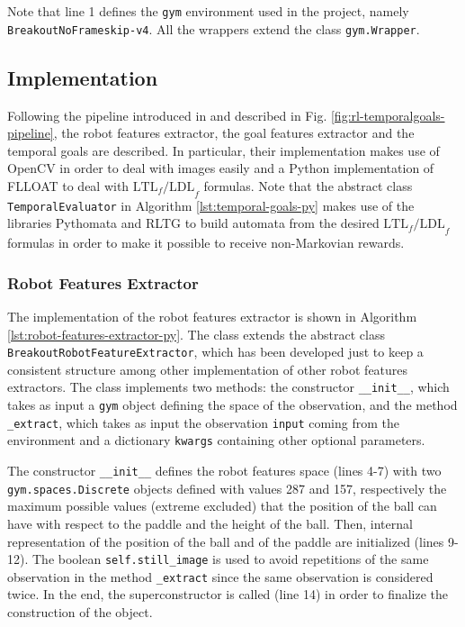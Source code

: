 Note that line 1 defines the \texttt{gym} environment used in the project,
namely \texttt{BreakoutNoFrameskip-v4}. All the wrappers extend the class
\texttt{gym.Wrapper}.



\subsection{Implementation}
Following the pipeline introduced in \cite{DBLP:journals/corr/abs-1807-06333}
and described in Fig. \ref{fig:rl-temporalgoals-pipeline}, the robot features
extractor, the goal features extractor and the temporal goals are described.
In particular, their implementation makes use of OpenCV \cite{opencv-library}
in order to deal
with images easily and a Python implementation of FLLOAT \cite{python-flloat}
to deal with $\text{LTL}_f\text{/LDL}_f$ formulas. Note that the abstract
class \texttt{TemporalEvaluator} in Algorithm \ref{lst:temporal-goals-py}
makes use of the libraries Pythomata \cite{pythomata} and RLTG \cite{rltg} to
build automata from the desired $\text{LTL}_f\text{/LDL}_f$ formulas in order
to make it possible to receive non-Markovian rewards.

\subsubsection{Robot Features Extractor}
The implementation of the robot features extractor is shown in Algorithm
\ref{lst:robot-features-extractor-py}. The class extends the abstract class
\texttt{BreakoutRobotFeatureExtractor}, which has been developed just to
keep a consistent structure among other implementation of other robot features
extractors. The class implements two methods: the constructor
\texttt{__init__}, which takes as input a \texttt{gym} object defining the space
of the observation, and the method \texttt{_extract}, which takes as input
the observation \texttt{input} coming from the environment and a dictionary
\texttt{kwargs} containing other optional parameters.

The constructor \texttt{__init__} defines the robot features space (lines 4-7)
with two \texttt{gym.spaces.Discrete} objects defined with values 287 and
157, respectively the maximum possible values (extreme excluded) that the
position of the ball can have with respect to the paddle and the height of the
ball. Then, internal representation of the position of the ball and of the
paddle are initialized (lines 9-12). The boolean \texttt{self.still_image}
is used to avoid repetitions of the same observation in the method
\texttt{_extract} since the same observation is considered twice. In the end,
the superconstructor is called (line 14) in order to finalize the
construction of the object.

